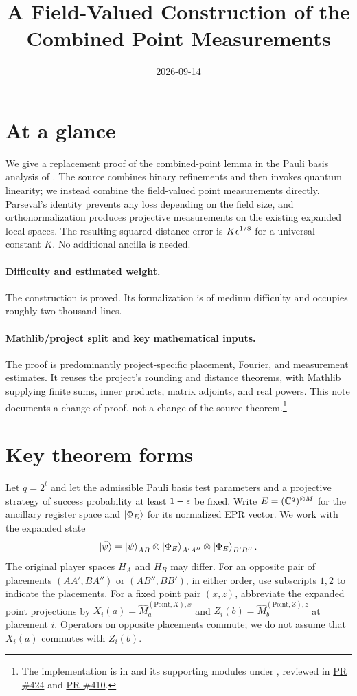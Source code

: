 \documentclass[11pt]{article}
\title{A Field-Valued Construction of the Combined Point Measurements}
\author{}
\date{2026-09-14}
\renewcommand{\ghpr}[1]{%
  \href{https://github.com/Dengnifer/MIPStarRE-QPBT/pull/#1}{PR \##1}}
\begin{document}
\maketitle

\section{At a glance}

We give a replacement proof of the combined-point lemma in the Pauli basis
analysis of \cite{Ji2020MIPStar}.  The source combines binary refinements and
then invokes quantum linearity; we instead combine the field-valued point
measurements directly.  Parseval's identity prevents any loss depending on
the field size, and orthonormalization produces projective measurements on
the existing expanded local spaces.  The resulting squared-distance error is
$K\epsilon^{1/8}$ for a universal constant $K$.  No additional ancilla is needed.

\paragraph{Difficulty and estimated weight.}
The construction is proved.  Its formalization is of medium difficulty and
occupies roughly two thousand lines.

\paragraph{Mathlib/project split and key mathematical inputs.}
The proof is predominantly project-specific placement, Fourier, and
measurement estimates.  It reuses the project's rounding and distance
theorems, with Mathlib supplying finite sums, inner products, matrix
adjoints, and real powers.  This note documents a change of proof, not a
change of the source theorem.\footnote{The implementation is in
 and its supporting modules under
, reviewed in \ghpr{424} and
\ghpr{410}.}

\section{Key theorem forms}

Let $q=2^t$ and let the admissible Pauli basis test parameters and a projective
strategy of success probability at least $1-\epsilon$ be fixed.  Write
$E=(\mathbb{C}^q)^{\otimes M}$ for the ancillary register space and
$\ket{\Phi_E}$ for its normalized EPR vector.  We work with the expanded state
\[
  \ket{\hat\psi}
  =\ket{\psi}_{AB}\otimes\ket{\Phi_E}_{A'A''}
    \otimes\ket{\Phi_E}_{B'B''}.
\]
The original player spaces $H_A$ and $H_B$ may differ.  For an opposite pair
of placements $(AA',BA'')$ or $(AB'',BB')$, in either order, use subscripts
$1,2$ to indicate the placements.  For a fixed point pair $(x,z)$, abbreviate
the expanded point projections by $X_i(a)=\hat M^{(\mathrm{Point},X),x}_a$
and $Z_i(b)=\hat M^{(\mathrm{Point},Z),z}_b$ at placement $i$.
Operators on opposite placements commute; we do not assume that $X_i(a)$
commutes with $Z_i(b)$.
\end{document}
